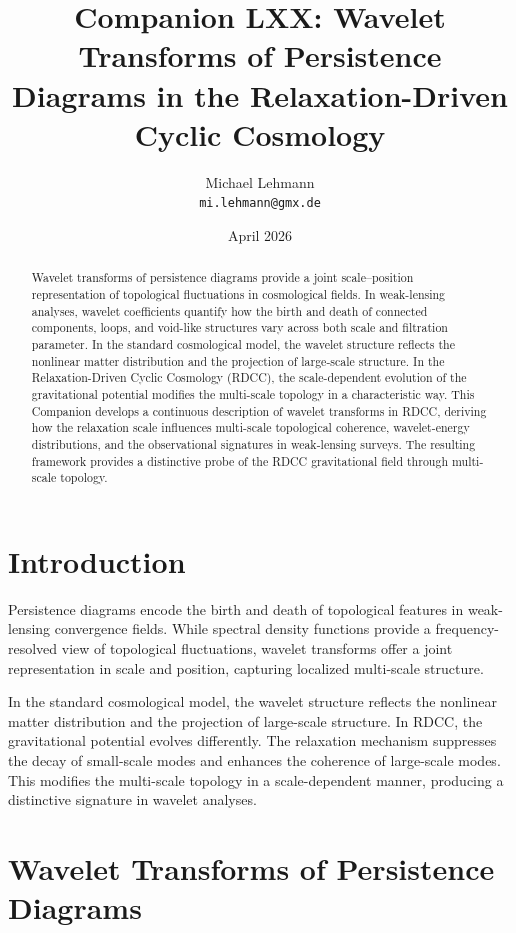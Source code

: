 \documentclass[11pt,a4paper]{article}
\title{\textbf{Companion LXX: Wavelet Transforms of Persistence Diagrams in the Relaxation-Driven Cyclic Cosmology}}
\author{Michael Lehmann \\ \texttt{mi.lehmann@gmx.de}}
\date{April 2026}
\begin{document}
\maketitle

\begin{abstract}
Wavelet transforms of persistence diagrams provide a joint scale–position 
representation of topological fluctuations in cosmological fields. In weak-lensing 
analyses, wavelet coefficients quantify how the birth and death of connected 
components, loops, and void-like structures vary across both scale and filtration 
parameter. In the standard cosmological model, the wavelet structure reflects the 
nonlinear matter distribution and the projection of large-scale structure. In the 
Relaxation-Driven Cyclic Cosmology (RDCC), the scale-dependent evolution of the 
gravitational potential modifies the multi-scale topology in a characteristic way. 
This Companion develops a continuous description of wavelet transforms in RDCC, 
deriving how the relaxation scale influences multi-scale topological coherence, 
wavelet-energy distributions, and the observational signatures in weak-lensing 
surveys. The resulting framework provides a distinctive probe of the RDCC 
gravitational field through multi-scale topology.
\end{abstract}
\section{Introduction}

Persistence diagrams encode the birth and death of topological features in 
weak-lensing convergence fields. While spectral density functions provide a 
frequency-resolved view of topological fluctuations, wavelet transforms offer a 
joint representation in scale and position, capturing localized multi-scale 
structure.

In the standard cosmological model, the wavelet structure reflects the nonlinear 
matter distribution and the projection of large-scale structure. In RDCC, the 
gravitational potential evolves differently. The relaxation mechanism suppresses 
the decay of small-scale modes and enhances the coherence of large-scale modes. 
This modifies the multi-scale topology in a scale-dependent manner, producing a 
distinctive signature in wavelet analyses.
\section{Wavelet Transforms of Persistence Diagrams}
\end{document}
